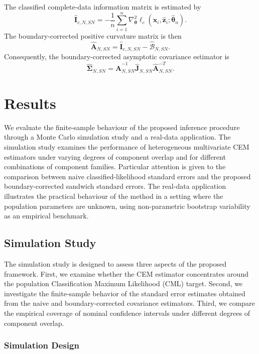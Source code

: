 \documentclass[pdflatex,sn-mathphys-ay]{sn-jnl}%
\let\oldtheta\theta
\renewcommand{\theta}{\boldsymbol{\oldtheta}}
\let\oldSigma\Sigma
\renewcommand{\Sigma}{\boldsymbol{\oldSigma}}
\theoremstyle{thmstyleone}%
\theoremstyle{thmstyletwo}%
\theoremstyle{thmstylethree}%
\begin{document}
The classified complete-data information matrix is estimated by
\[
    \widehat{\mathbf I}_{c,N,SN}
    =
    -
    \frac{1}{n}
    \sum_{i=1}^n
    \nabla_{\boldsymbol{\theta}}^2
    \ell_c
    (
        \mathbf{x}_i,
        \widehat{\mathbf{z}}_i;
        \widehat{\boldsymbol{\theta}}_n
    ).
\]
The boundary-corrected positive curvature matrix is then
\[
    \widehat{\mathbf A}_{N,SN}
    =
    \widehat{\mathbf I}_{c,N,SN}
    -
    \widehat{\mathcal B}_{N,SN}.
\]
Consequently, the boundary-corrected asymptotic covariance estimator is
\[
    \widehat{\boldsymbol{\Sigma}}_{N,SN}
    =
    \widehat{\mathbf A}_{N,SN}^{-1}
    \widehat{\mathbf J}_{N,SN}
    \widehat{\mathbf A}_{N,SN}^{-T}.
\]


\section{Results}
\label{sec:results}

We evaluate the finite-sample behaviour of the proposed inference procedure through a Monte Carlo simulation study and a real-data application. The simulation study examines the performance of heterogeneous multivariate CEM estimators under varying degrees of component overlap and for different combinations of component families. Particular attention is given to the comparison between naive classified-likelihood standard errors and the proposed boundary-corrected sandwich standard errors. The real-data application illustrates the practical behaviour of the method in a setting where the population parameters are unknown, using non-parametric bootstrap variability as an empirical benchmark.

\subsection{Simulation Study}
\label{subsec:simulation}

The simulation study is designed to assess three aspects of the proposed framework. First, we examine whether the CEM estimator concentrates around the population Classification Maximum Likelihood (CML) target. Second, we investigate the finite-sample behavior of the standard error estimates obtained from the naive and boundary-corrected covariance estimators. Third, we compare the empirical coverage of nominal confidence intervals under different degrees of component overlap.

\subsubsection{Simulation Design}
\end{document}

